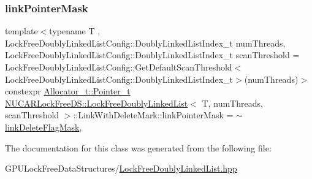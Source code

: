 \mbox{\label{class_n_u_c_a_r_lock_free_d_s_1_1_lock_free_doubly_linked_list_1_1_link_with_delete_mark_a9a0d4322dd840571fa886b966618d9a9}} 
\subsubsection{\texorpdfstring{link\+Pointer\+Mask}{linkPointerMask}}
{\footnotesize\ttfamily template$<$typename T , Lock\+Free\+Doubly\+Linked\+List\+Config\+::\+Doubly\+Linked\+List\+Index\+\_\+t num\+Threads, Lock\+Free\+Doubly\+Linked\+List\+Config\+::\+Doubly\+Linked\+List\+Index\+\_\+t scan\+Threshold = Lock\+Free\+Doubly\+Linked\+List\+Config\+::\+Get\+Default\+Scan\+Threshold$<$\+Lock\+Free\+Doubly\+Linked\+List\+Config\+::\+Doubly\+Linked\+List\+Index\+\_\+t$>$(num\+Threads)$>$ \\
constexpr \mbox{\hyperlink{class_n_u_c_a_r_lock_free_d_s_1_1_allocator_a3931e84d06ddd3b436103475197eb12a}{Allocator\+\_\+t\+::\+Pointer\+\_\+t}} \mbox{\hyperlink{class_n_u_c_a_r_lock_free_d_s_1_1_lock_free_doubly_linked_list}{N\+U\+C\+A\+R\+Lock\+Free\+D\+S\+::\+Lock\+Free\+Doubly\+Linked\+List}}$<$ T, num\+Threads, scan\+Threshold $>$\+::Link\+With\+Delete\+Mark\+::link\+Pointer\+Mask = $\sim$\mbox{\hyperlink{class_n_u_c_a_r_lock_free_d_s_1_1_lock_free_doubly_linked_list_1_1_link_with_delete_mark_af670d4e1c35ee581cbc55ec70e1de6c4}{link\+Delete\+Flag\+Mask}}\hspace{0.3cm}{\ttfamily [static]}, {\ttfamily [private]}}



The documentation for this class was generated from the following file\+:\begin{DoxyCompactItemize}
\item 
G\+P\+U\+Lock\+Free\+Data\+Structures/\mbox{\hyperlink{_lock_free_doubly_linked_list_8hpp}{Lock\+Free\+Doubly\+Linked\+List.\+hpp}}\end{DoxyCompactItemize}
